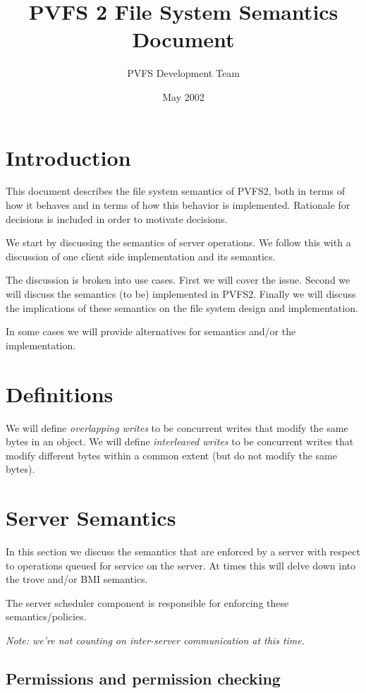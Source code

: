 \documentclass[10pt]{article} %
\title{PVFS 2 File System Semantics Document}
\author{PVFS Development Team}
\date{May 2002}
\begin{document}
\maketitle

\section{Introduction}

This document describes the file system semantics of PVFS2, both in terms of
how it behaves and in terms of how this behavior is implemented.  Rationale
for decisions is included in order to motivate decisions.

We start by discussing the semantics of server operations.  We follow this
with a discussion of one client side implementation and its semantics.

The discussion is broken into use cases.  First we will cover the issue.
Second we will discuss the semantics (to be) implemented in PVFS2.  Finally we
will discuss the implications of these semantics on the file system design and
implementation.

In some cases we will provide alternatives for semantics and/or the
implementation.

\section{Definitions}

We will define \emph{overlapping writes} to be concurrent writes that modify
the same bytes in an object.  We will define \emph{interleaved writes} to be
concurrent writes that modify different bytes within a common extent (but do
not modify the same bytes).

\section{Server Semantics}

In this section we discuss the semantics that are enforced by a server with
respect to operations queued for service on the server.  At times this will
delve down into the trove and/or BMI semantics.

The server scheduler component is responsible for enforcing these
semantics/policies.

\emph{Note: we're not counting on inter-server communication at this time.}

\subsection{Permissions and permission checking}
\end{document}
